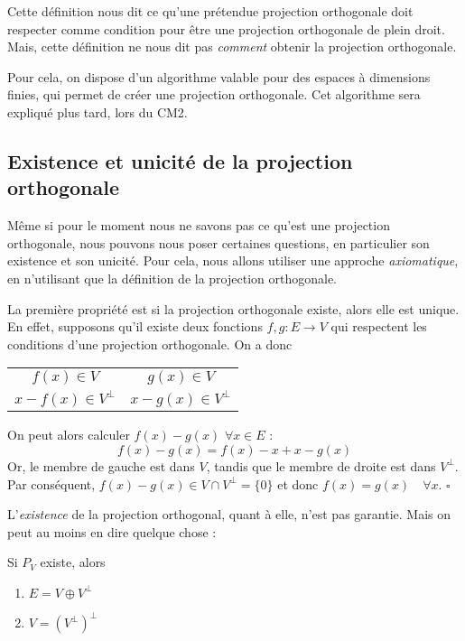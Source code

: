 Cette définition nous dit ce qu'une prétendue projection orthogonale doit respecter comme condition pour être une projection orthogonale de plein droit. Mais, cette définition ne nous dit pas \emph{comment} obtenir la projection orthogonale.

Pour cela, on dispose d'un \og algorithme \fg{} valable pour des espaces à dimensions finies, qui permet de créer une projection orthogonale. Cet algorithme sera expliqué plus tard, lors du CM2.

\subsection{Existence et unicité de la projection orthogonale}

Même si pour le moment nous ne savons pas ce qu'est une projection orthogonale, nous pouvons nous poser certaines questions, en particulier son existence et son unicité. Pour cela, nous allons utiliser une approche \emph{axiomatique}, en n'utilisant que la définition de la projection orthogonale.

La première propriété est si la projection orthogonale existe, alors elle est unique. En effet, supposons qu'il existe deux fonctions $f, g : E \rightarrow V$ qui respectent les conditions d'une projection orthogonale. On a donc
\begin{center}
\begin{tabular}{cc}
$f(x) \in V$ & $g(x) \in V$ \\
$x-f(x) \in V^\perp$ & $x-g(x) \in V^\perp$ \\
\end{tabular}
\end{center}

On peut alors calculer $f(x)-g(x)$ $\forall x \in E$ :
\[ f(x)-g(x) = f(x) - x + x - g(x) \]
Or, le membre de gauche est dans $V$, tandis que le membre de droite est dans $V^\perp$. Par conséquent, $f(x)-g(x) \in V \cap V^\perp = \{ 0 \}$ et donc $f(x)=g(x) \quad \forall x$. $\square$

L'\emph{existence} de la projection orthogonal, quant à elle, n'est pas garantie. Mais on peut au moins en dire quelque chose :

\begin{propriete}
\label{projortho_exist_Vperp}
Si $P_V$ existe, alors
\begin{enumerate}
\item $E=V \oplus V^\perp$
\item $V=\left( V^\perp \right)^\perp$
\end{enumerate}
\end{propriete}

